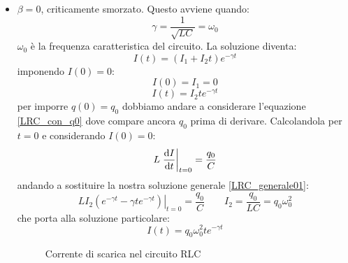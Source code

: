 \begin{itemize}
  \item{$\beta=0$}, criticamente smorzato. Questo avviene quando:
  \begin{equation}
    \gamma=\frac{1}{\sqrt{LC}}=\omega_0
  \end{equation}
  $\omega_0$ è la frequenza caratteristica del circuito. La soluzione diventa:
  \begin{equation}
    I(t)=(I_1+I_2t)e^{-\gamma t}
  \end{equation}
  imponendo $I(0)=0$:
  \[
    I(0)=I_1=0
  \]
  \begin{equation}
    I(t)=I_2 te^{-\gamma t}
    \label{LRC_generale01}
  \end{equation}
  per imporre $q(0)=q_0$ dobbiamo andare a considerare l'equazione \eqref{LRC_con_q0} dove compare ancora $q_0$ prima di derivare. Calcolandola per $t=0$ e considerando $I(0)=0$:
  \begin{equation}
    L\left.\frac{\mathrm{d} I}{\mathrm{d} t}\right|_{t=0}=\frac{q_0}{C}
    \label{che_bellissima!}
  \end{equation}
  andando a sostituire la nostra soluzione generale \eqref{LRC_generale01}:
  \begin{equation}
    LI_2\left.\left(e^{-\gamma t}-\gamma te^{-\gamma t}\right)\right|_{t=0}=\frac{q_0}{C}\qquad I_2=\frac{q_0}{LC}=q_0\omega_0^2
  \end{equation}
  che porta alla soluzione particolare:
  \begin{equation}
    I(t)=q_0\omega_0^2 te^{-\gamma t}
  \end{equation}
  \begin{figure}
    \centering
    
    \caption{Corrente di scarica nel circuito RLC}
  \end{figure}


\end{itemize}
